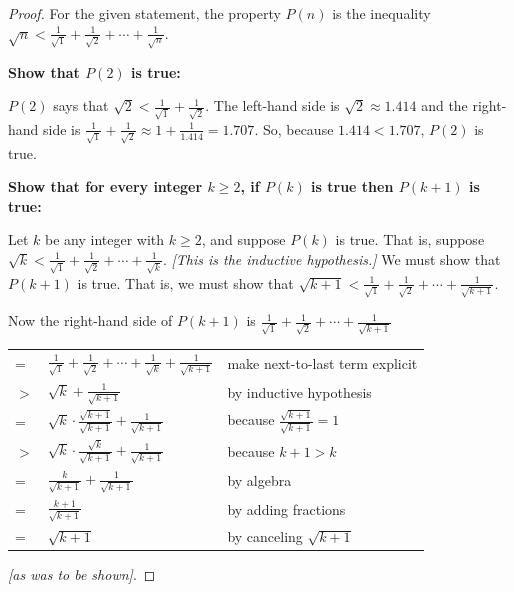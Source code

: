 \documentclass[14pt]{extarticle}
\newcommand{\dps}{\displaystyle}
\newcommand{\cy}{\color{cyan}}
\begin{document}
\begin{proof}
For the given statement, the property $P(n)$ is the inequality $\dps \sqrt{n} < \frac{1}{\sqrt{1}} + \frac{1}{\sqrt{2}} + \cdots + \frac{1}{\sqrt{n}}$. 

{\bf Show that $P(2)$ is true:} 

$P(2)$ says that $\dps \sqrt{2} < \frac{1}{\sqrt{1}} + \frac{1}{\sqrt{2}}$. The left-hand side is $\dps \sqrt{2} \approx 1.414$ and the right-hand side is $\dps \frac{1}{\sqrt{1}} + \frac{1}{\sqrt{2}} \approx 1 + \frac{1}{1.414} = 1.707$. So, because $1.414 < 1.707$, $P(2)$ is true. 

{\bf Show that for every integer $k \geq 2$, if $P(k)$ is true then $P(k + 1)$ is true:} 

Let $k$ be any integer with $k \geq 2$, and suppose $P(k)$ is true. That is, suppose $\dps \sqrt{k} < \frac{1}{\sqrt{1}} + \frac{1}{\sqrt{2}} + \cdots + \frac{1}{\sqrt{k}}$. {\it [This is the inductive hypothesis.]} We must show that $P(k + 1)$ is true. That is, we must show that $\dps \sqrt{k+1} < \frac{1}{\sqrt{1}} + \frac{1}{\sqrt{2}} + \cdots + \frac{1}{\sqrt{k+1}}$. 

Now the right-hand side of $P(k+1)$ is $\dps \frac{1}{\sqrt{1}} + \frac{1}{\sqrt{2}} + \cdots + \frac{1}{\sqrt{k+1}}$

\begin{center}
\begin{tabular}{lll}
= & $\dps \frac{1}{\sqrt{1}} + \frac{1}{\sqrt{2}} + \cdots + \frac{1}{\sqrt{k}} + \frac{1}{\sqrt{k+1}}$ & {\cy make next-to-last term explicit} \\
$>$ & $\dps \sqrt{k} + \frac{1}{\sqrt{k+1}}$ & {\cy by inductive hypothesis} \\
= & $\dps \sqrt{k} \cdot \frac{\sqrt{k + 1}}{\sqrt{k + 1}} + \frac{1}{\sqrt{k+1}}$ & {\cy because $\frac{\sqrt{k + 1}}{\sqrt{k + 1}} = 1$} \\
$>$ & $\dps \sqrt{k} \cdot \frac{\sqrt{k}}{\sqrt{k + 1}} + \frac{1}{\sqrt{k+1}}$ & {\cy because $k + 1 > k$} \\
= & $\dps \frac{k}{\sqrt{k + 1}} + \frac{1}{\sqrt{k+1}}$ & {\cy by algebra} \\
= & $\dps \frac{k+1}{\sqrt{k + 1}}$ & {\cy by adding fractions} \\
= & $\dps \sqrt{k + 1}$ & {\cy by canceling $\sqrt{k+1}$}
\end{tabular}
\end{center}

{\it [as was to be shown]}.
\end{proof}
\end{document}
